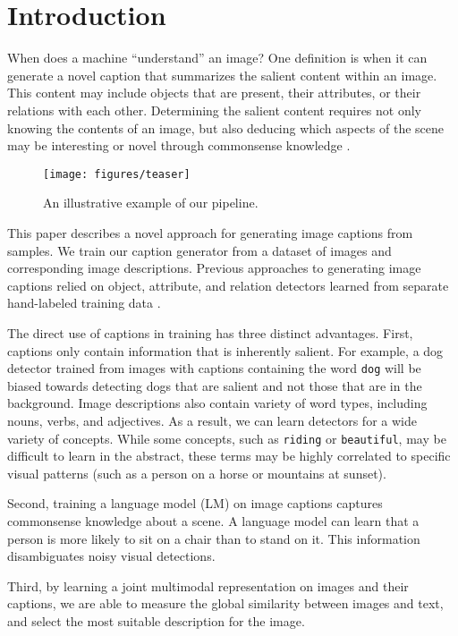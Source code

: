 \documentclass[10pt,twocolumn,letterpaper]{article}
\begin{document}
\section{Introduction}\label{sec:introduction}

When does a machine ``understand'' an image? One definition is when it can generate a novel caption that summarizes the salient content within an image. This content may include objects that are present, their attributes, or their relations with each other. Determining the salient content requires not only knowing the contents of an image, but also deducing which aspects of the scene may be interesting or novel through commonsense knowledge \cite{zitnickCVPR13,ChenICCV2013neil,levan}.

\begin{figure}\centering
 \texttt{[image: figures/teaser]}
 \caption{An illustrative example of our pipeline.}\label{fig:teaser}
\end{figure}

This paper describes a novel approach for generating image captions from samples. We train our caption generator from a dataset of images and corresponding image descriptions. Previous approaches to generating image captions relied on object, attribute, and relation detectors learned from separate hand-labeled training data \cite{yang2011corpus,kulkarni2011baby}.

The direct use of captions in training has three distinct advantages. First, captions only contain information that is inherently salient. For example, a dog detector trained from images with captions containing the word \texttt{dog} will be biased towards detecting dogs that are salient and not those that are in the background. Image descriptions also contain variety of word types, including nouns, verbs, and adjectives.  As a result, we can learn detectors for a wide variety of concepts. While some concepts, such as \texttt{riding} or \texttt{beautiful}, may be difficult to learn in the abstract, these terms may be highly correlated to specific visual patterns (such as a person on a horse or mountains at sunset).

Second, training a language model (LM) on image captions captures commonsense knowledge about a scene. A language model can learn that a person is more likely to sit on a chair than to stand on it. This information disambiguates noisy visual detections.

Third, by learning a joint multimodal representation on images and their captions, we are able to measure the global similarity between images and text, and select the most suitable description for the image.
\end{document}

